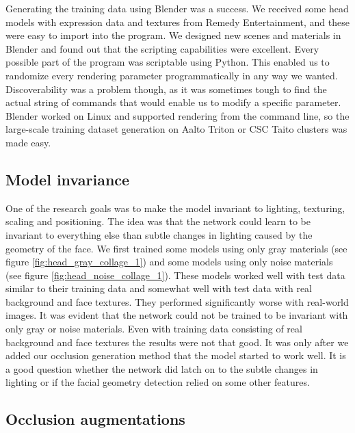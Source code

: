 Generating the training data using Blender was a success. We received some head models with expression data and textures from Remedy Entertainment, and these were easy to import into the program. We designed new scenes and materials in Blender and found out that the scripting capabilities were excellent. Every possible part of the program was scriptable using Python. This enabled us to randomize every rendering parameter programmatically in any way we wanted. Discoverability was a problem though, as it was sometimes tough to find the actual string of commands that would enable us to modify a specific parameter. Blender worked on Linux and supported rendering from the command line, so the large-scale training dataset generation on Aalto Triton or \ac{CSC} Taito clusters was made easy.

\subsection{Model invariance}

One of the research goals was to make the model invariant to lighting, texturing, scaling and positioning. The idea was that the network could learn to be invariant to everything else than subtle changes in lighting caused by the geometry of the face. We first trained some models using only gray materials (see figure \ref{fig:head_gray_collage_1}) and some models using only noise materials (see figure \ref{fig:head_noise_collage_1}). These models worked well with test data similar to their training data and somewhat well with test data with real background and face textures. They performed significantly worse with real-world images. It was evident that the network could not be trained to be invariant with only gray or noise materials. Even with training data consisting of real background and face textures the results were not that good. It was only after we added our occlusion generation method that the model started to work well. It is a good question whether the network did latch on to the subtle changes in lighting or if the facial geometry detection relied on some other features.

\subsection{Occlusion augmentations}

